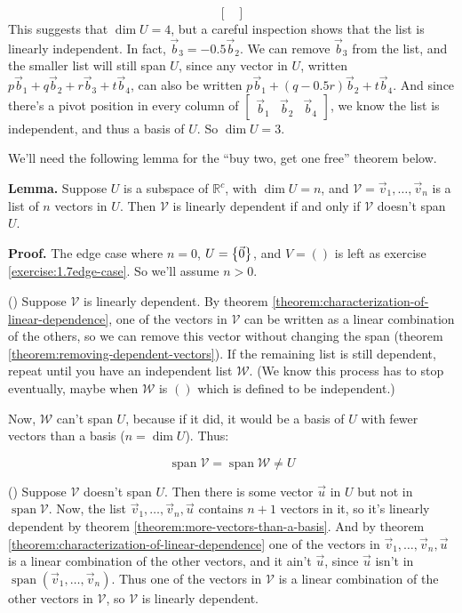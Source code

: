 \documentclass[11pt, letterpaper]{report}
\newenvironment{notes}{}{}
\newenvironment{book}{}{}
\let\originalleft\left
\let\originalright\right
\renewcommand{\left}{\mathopen{}\mathclose\bgroup\originalleft}
\renewcommand{\right}{\aftergroup\egroup\originalright}
\newcounter{exercise}[section]
\newcounter{theorem}[chapter]
\newlength\oldfboxsep%
\newlength\myminiwidth%
\newenvironment{bbox}{%
  \setlength\oldfboxsep\fboxsep
  \setlength{\fboxsep}{.1in}%
  \setlength\myminiwidth\linewidth%
  \addtolength\myminiwidth{-0.2in}%
  \vspace{0.1in}%
  \begin{lrbox}{\bboxbox}\begin{minipage}{\myminiwidth}%
    }{%
    \end{minipage}\end{lrbox}%
  \noindent\fbox{\usebox{\bboxbox}}\vspace{0.1in}\setlength\fboxsep\oldfboxsep%
}
\newcommand{\R}{\mathbb{R}}
\DeclareMathOperator{\spn}{span}
\begin{document}
\begin{book}
\[\begin{bmatrix}
\end{bmatrix}\]
This suggests that $\dim U = 4$, but a careful inspection shows that the list is linearly independent. In fact, $\vec{b}_3=-0.5\vec{b}_2$. We can remove $\vec{b}_3$ from the list, and the smaller list will still span $U$, since any vector in $U$, written $p\vec{b}_1+q\vec{b}_2+r\vec{b}_3+t\vec{b}_4$, can also be written $p\vec{b}_1+(q-0.5r)\vec{b}_2+t\vec{b}_4$. And since there's a pivot position in every column of $\begin{bmatrix}
\vec{b}_1 & \vec{b}_2 & \vec{b}_4
\end{bmatrix}$, we know the list is independent, and thus a basis of $U$. So $\dim U= 3$. \blacksquare
\end{book}

We'll need the following lemma for the ``buy two, get one free'' theorem below.

\begin{bbox}
\textbf{Lemma.} Suppose $U$ is a subspace of $\R^c$, with $\dim U = n$, and $\mathcal{V} = \vec{v}_1,\ldots,\vec{v}_n$ is a list of $n$ vectors in $U$. Then $\mathcal{V}$ is linearly dependent if and only if $\mathcal{V}$ doesn't span $U$.
\end{bbox}

\begin{notes}
\vfill
\vfill
\end{notes}

\begin{book}
\textbf{Proof.} The edge case where $n=0$, $U=\left\{ \vec{0} \right\}$, and $V = ()$ is left as exercise \ref{exercise:1.7edge-case}. So we'll assume $n >0$.

(\rightarrow) Suppose $\mathcal{V}$ is linearly dependent. By theorem \ref{theorem:characterization-of-linear-dependence}, one of the vectors in $\mathcal{V}$ can be written as a linear combination of the others, so we can remove this vector without changing the span (theorem \ref{theorem:removing-dependent-vectors}). If the remaining list is still dependent, repeat until you have an independent list $\mathcal{W}$. (We know this process has to stop eventually, maybe when $\mathcal{W}$ is $()$ which is defined to be independent.)

Now, $\mathcal{W}$ can't span $U$, because if it did, it would be a basis of $U$ with fewer vectors than a basis ($n = \dim U$). Thus:

 \[\spn \mathcal{V} = \spn \mathcal{W} \ne U\]

(\leftarrow) Suppose $\mathcal{V}$ doesn't span $U$. Then there is some vector $\vec{u}$ in $U$ but not in $\spn \mathcal{V}$. Now, the list $\vec{v}_1,\ldots,\vec{v}_n, \vec{u}$ contains $n+1$ vectors in it, so it's linearly dependent by theorem \ref{theorem:more-vectors-than-a-basis}. And by theorem \ref{theorem:characterization-of-linear-dependence} one of the vectors in $\vec{v}_1,\ldots,\vec{v}_n, \vec{u}$ is a linear combination of the other vectors, and it ain't $\vec{u}$, since $\vec{u}$ isn't in $\spn ( \vec{v}_1,\ldots,\vec{v}_n )$. Thus one of the vectors in $\mathcal{V}$ is a linear combination of the other vectors in $\mathcal{V}$, so $\mathcal{V}$ is linearly dependent. \blacksquare
\end{book}
\end{document}
